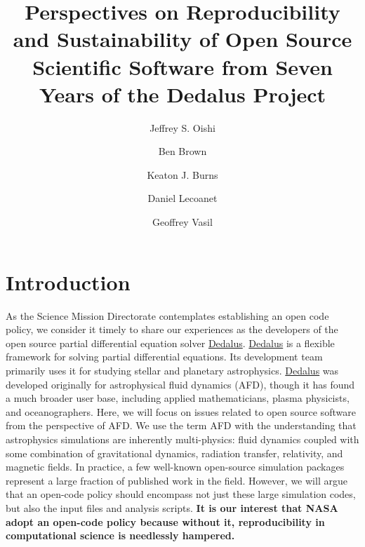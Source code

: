 \documentclass[12pt, titlepage]{aastex62}
\newcommand{\dedalus}{\href{http://dedalus-project.org}{Dedalus}}
\begin{document}
\title{Perspectives on Reproducibility and Sustainability of Open Source Scientific Software from Seven Years of the Dedalus Project}
\author{Jeffrey S. Oishi}
\author{Ben Brown}
\author{Keaton J. Burns}
\author{Daniel Lecoanet}
\author{Geoffrey Vasil}

\begin{abstract}

\end{abstract}

\section{Introduction}
\label{sec:intro}
As the Science Mission Directorate contemplates establishing an open code policy, we consider it timely to share our experiences as the developers of the open source partial differential equation solver \dedalus{}. \dedalus{} is a flexible framework for solving partial differential equations. Its development team primarily uses it for studying stellar and planetary astrophysics.  \dedalus{} was developed originally for astrophysical fluid dynamics (AFD), though it has found a much broader user base, including applied mathematicians, plasma physicists, and oceanographers. Here, we will focus on issues related to open source software from the perspective of AFD. We use the term AFD with the understanding that astrophysics simulations are inherently multi-physics: fluid dynamics coupled with some combination of gravitational dynamics, radiation transfer, relativity, and magnetic fields. In practice, a few well-known open-source simulation packages represent a large fraction of published work in the field. However, we will argue that an open-code policy should encompass not just these large simulation codes, but also the input files and analysis scripts. \textbf{It is our interest that NASA adopt an open-code policy because without it, reproducibility in computational science is needlessly hampered.} 
\end{document}
